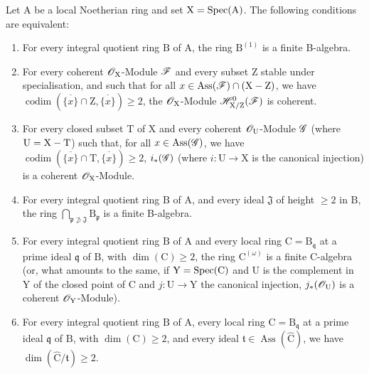 \begin{proposition}[7.2.4]
\label{IV.7.2.4}
Let $\mathrm{A}$ be a local Noetherian ring and set $\mathrm{X}=\operatorname{Spec}(\mathrm{A})$.
The following conditions are equivalent:
\begin{enumerate}[label=\emph{\alph*)}]
  \item For every integral quotient ring $\mathrm{B}$ of $\mathrm{A}$, the ring $\mathrm{B}^{(1)}$ is a finite B-algebra.
  \item For every coherent $\mathscr{O}_\mathrm{X}$-Module $\mathscr{F}$ and every subset $\mathrm{Z}$ stable under specialisation, and such that for all $x\in\operatorname{Ass}(\mathscr{F})\cap(\mathrm{X}-\mathrm{Z})$, we have $\operatorname{codim}(\overline{\{x\}}\cap\mathrm{Z},\overline{\{x\}})\geqslant 2$, the $\mathscr{O}_\mathrm{X}$-Module $\mathscr{H}^0_{\mathrm{X}/\mathrm{Z}}(\mathscr{F})$ is coherent.
  \item For every closed subset $\mathrm{T}$ of $\mathrm{X}$ and every coherent $\mathscr{O}_\mathrm{U}$-Module $\mathscr{G}$ (where $\mathrm{U}=\mathrm{X}-\mathrm{T}$) such that, for all $x\in\operatorname{Ass}(\mathscr{G})$, we have $\operatorname{codim}(\overline{\{x\}}\cap\mathrm{T},\overline{\{x\}})\geqslant 2$, $i_*(\mathscr{G})$ (where $i:\mathrm{U}\to\mathrm{X}$ is the canonical injection) is a coherent $\mathscr{O}_\mathrm{X}$-Module.
  \item For every integral quotient ring $\mathrm{B}$ of $\mathrm{A}$, and every ideal $\mathfrak{J}$ of height $\geqslant 2$ in $\mathrm{B}$, the ring $\bigcap_{\mathfrak{p}\not\supset\mathfrak{J}}\mathrm{B}_\mathfrak{p}$ is a finite B-algebra.
  \item For every integral quotient ring $\mathrm{B}$ of $\mathrm{A}$ and every local ring $\mathrm{C}=\mathrm{B}_\mathfrak{q}$ at a prime ideal $\mathfrak{q}$ of $\mathrm{B}$, with $\dim(\mathrm{C})\geqslant 2$, the ring $\mathrm{C}^{(\omega)}$ is a finite C-algebra \textup{(or, what amounts to the same,} if $\mathrm{Y}=\operatorname{Spec}(\mathrm{C})$ and $\mathrm{U}$ is the complement in $\mathrm{Y}$ of the closed point of $\mathrm{C}$ and $j:\mathrm{U}\to\mathrm{Y}$ the canonical injection, $j_*(\mathscr{O}_\mathrm{U})$ is a coherent $\mathscr{O}_\mathrm{Y}$-Module).
  \item For every integral quotient ring $\mathrm{B}$ of $\mathrm{A}$, every local ring $\mathrm{C}=\mathrm{B}_\mathfrak{q}$ at a prime ideal $\mathfrak{q}$ of $\mathrm{B}$, with $\dim(\mathrm{C})\geqslant 2$, and every ideal $\mathfrak{t}\in\operatorname{Ass}(\widehat{\mathrm{C}})$, we have $\dim(\widehat{\mathrm{C}}/\mathfrak{t})\geqslant 2$.
\end{enumerate}
\end{proposition}

